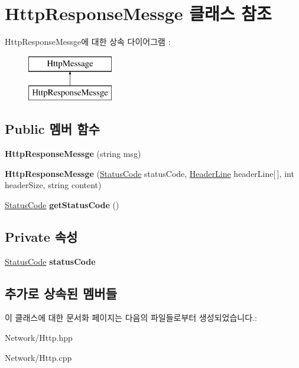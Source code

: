 \hypertarget{class_http_response_messge}{}\section{Http\+Response\+Messge 클래스 참조}
\label{class_http_response_messge}
Http\+Response\+Messge에 대한 상속 다이어그램 \+: \begin{figure}[H]
\begin{center}
\leavevmode
\includegraphics[height=2.000000cm]{class_http_response_messge}
\end{center}
\end{figure}
\subsection*{Public 멤버 함수}
\begin{DoxyCompactItemize}
\item 
\mbox{\label{class_http_response_messge_a39de70d4e32c1aaeed22b898a2a822f0}} 
{\bfseries Http\+Response\+Messge} (string msg)
\item 
\mbox{\label{class_http_response_messge_a721439e54155ff73e7cad6ed90406ceb}} 
{\bfseries Http\+Response\+Messge} (\hyperlink{struct_status_code}{Status\+Code} status\+Code, \hyperlink{struct_header_line}{Header\+Line} header\+Line\mbox{[}$\,$\mbox{]}, int header\+Size, string content)
\item 
\mbox{\label{class_http_response_messge_a2f440a1820c19d351ee937baa5a6247d}} 
\hyperlink{struct_status_code}{Status\+Code} {\bfseries get\+Status\+Code} ()
\end{DoxyCompactItemize}
\subsection*{Private 속성}
\begin{DoxyCompactItemize}
\item 
\mbox{\label{class_http_response_messge_acd37bd151db9bd4d4a3ade3282268529}} 
\hyperlink{struct_status_code}{Status\+Code} {\bfseries status\+Code}
\end{DoxyCompactItemize}
\subsection*{추가로 상속된 멤버들}


이 클래스에 대한 문서화 페이지는 다음의 파일들로부터 생성되었습니다.\+:\begin{DoxyCompactItemize}
\item 
Network/Http.\+hpp\item 
Network/Http.\+cpp\end{DoxyCompactItemize}
